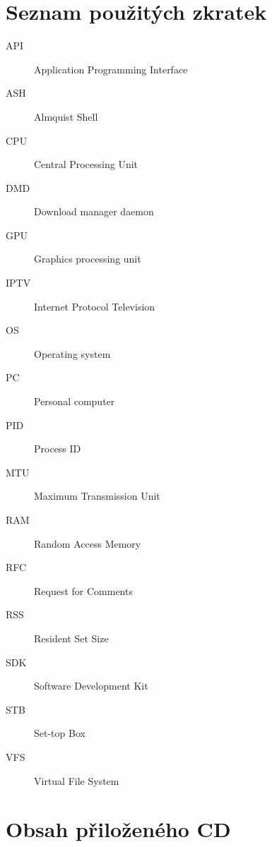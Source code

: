 \documentclass[thesis=B,czech]{FITthesis}[2012/06/26]
\begin{document}
\chapter{Seznam použitých zkratek}
\begin{description}
	\item[API] Application Programming Interface
	\item[ASH] Almquist Shell
	\item[CPU] Central Processing Unit
	\item[DMD] Download manager daemon
	\item[GPU] Graphics processing unit
	\item[IPTV] Internet Protocol Television
	\item[OS] Operating system
	\item[PC] Personal computer
	\item[PID] Process ID
	\item[MTU] Maximum Transmission Unit
	\item[RAM] Random Access Memory
	\item[RFC] Request for Comments
	\item[RSS] Resident Set Size
	\item[SDK] Software Development Kit
	\item[STB] Set-top Box
	\item[VFS] Virtual File System
\end{description}

\chapter{Obsah přiloženého CD}

\begin{figure}
\end{figure}
\end{document}
